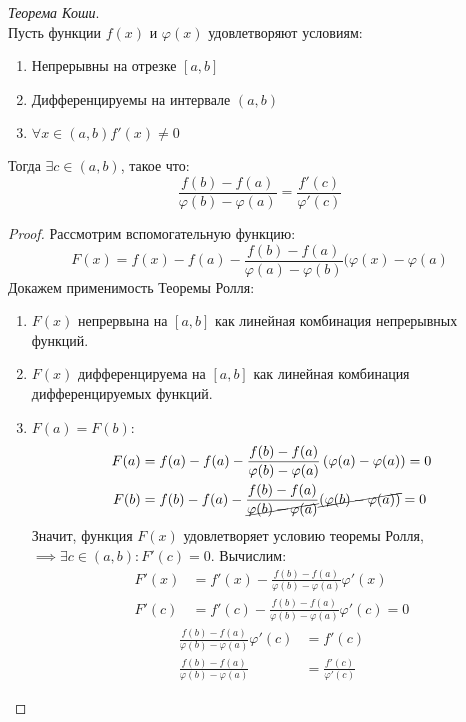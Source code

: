 \begin{theorem}
  \textit{Теорема Коши}. \\
  Пусть функции $f(x)$ и  $\varphi(x)$ удовлетворяют условиям: 
  \begin{enumerate}
    \item Непрерывны на отрезке $[a, b]$
    \item Дифференцируемы на интервале  $(a, b)$ 
    \item  $\forall x \in (a, b) f'(x) \neq 0$
  \end{enumerate}
  Тогда $\exists  c \in (a, b)$, такое что: \[
    \boxed{\frac{f(b) - f(a)}{\varphi(b) - \varphi(a)} = \frac{f'(c)}{\varphi'(c)}}
  \] 
\end{theorem}
\begin{proof}
  Рассмотрим вспомогательную функцию: \[
    F(x) = f(x) - f(a) - \frac{f(b) - f(a)}{\varphi(a) - \varphi(b)}(\varphi(x) - \varphi(a)
  \]
  Докажем применимость Теоремы Ролля:
  \begin{enumerate}
    \item $F(x)$ непрервына на $[a, b]$ как линейная комбинация непрерывных функций.
    \item  $F(x)$ дифференцируема на $[a, b]$ как линейная комбинация дифференцируемых функций.
    \item  $F(a) = F(b)$:
      \begin{align*}
        F(a) &= f(a) - f(a) - \frac{f(b) - f(a)}{\varphi(b) - \varphi(a)}\left( \varphi(a) - \varphi(a) \right) = 0 \\ 
        F(b) &= f(b) - f(a) - \frac{f(b) - f(a)}{\cancel{\varphi(b) - \varphi(a)}}\cancel{\left( \varphi(b) - \varphi(a) \right)} = 0 \\ 
      \end{align*}
    Значит, функция $F(x)$ удовлетворяет условию теоремы Ролля, $\implies \exists  c \in (a, b) : F'(c) = 0$. Вычислим:
    \begin{align*}
      F'(x) &= f'(x) - \frac{f(b) - f(a)}{\varphi(b) - \varphi(a)} \varphi'(x) \\ 
      F'(c) &= f'(c) - \frac{f(b) - f(a)}{\varphi(b) - \varphi(a)} \varphi'(c) = 0
    \end{align*}
    \begin{align*}
      \frac{f(b) - f(a)}{\varphi(b) - \varphi(a)} \varphi'(c) &= f'(c) \\
      \frac{f(b) - f(a)}{\varphi(b) - \varphi(a)} &= \frac{f'(c)}{\varphi'(c)}
    \end{align*}
  \end{enumerate}
\end{proof}

